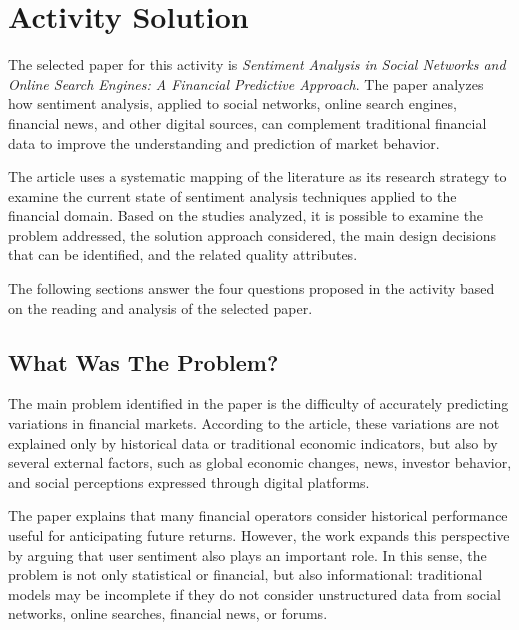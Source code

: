
\section{Activity Solution}
\vspace{2mm}

The selected paper for this activity is \textit{Sentiment Analysis in Social Networks and Online Search Engines: A Financial Predictive Approach}. The paper analyzes how sentiment analysis, applied to social networks, online search engines, financial news, and other digital sources, can complement traditional financial data to improve the understanding and prediction of market behavior.

\vspace{2mm}

The article uses a systematic mapping of the literature as its research strategy to examine the current state of sentiment analysis techniques applied to the financial domain. Based on the studies analyzed, it is possible to examine the problem addressed, the solution approach considered, the main design decisions that can be identified, and the related quality attributes.

\vspace{2mm}

The following sections answer the four questions proposed in the activity based on the reading and analysis of the selected paper.


\subsection{What Was The Problem?}
\vspace{2mm}

The main problem identified in the paper is the difficulty of accurately predicting variations in financial markets. According to the article, these variations are not explained only by historical data or traditional economic indicators, but also by several external factors, such as global economic changes, news, investor behavior, and social perceptions expressed through digital platforms.

\vspace{2mm}

The paper explains that many financial operators consider historical performance useful for anticipating future returns. However, the work expands this perspective by arguing that user sentiment also plays an important role. In this sense, the problem is not only statistical or financial, but also informational: traditional models may be incomplete if they do not consider unstructured data from social networks, online searches, financial news, or forums.

